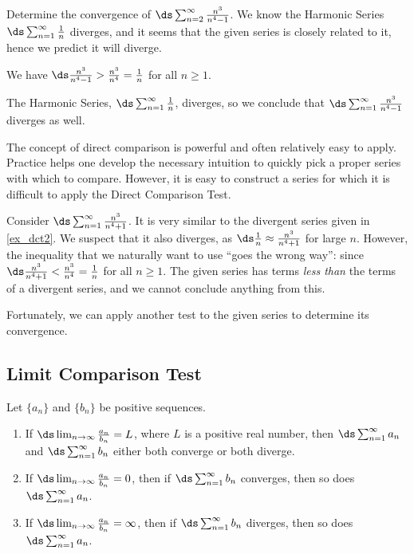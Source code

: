 \begin{example}\label{ex_dct2}
Determine the convergence of $\ds\sum_{n=2}^\infty \frac{n^3}{n^4-1}$.
\solution
We know the Harmonic Series $\ds\sum_{n=1}^\infty \frac1n$ diverges, and it seems that the given series is closely related to it, hence we predict it will diverge. 

We have $\ds \frac{n^3}{n^4-1}>\frac{n^3}{n^4}=\frac{1}{n}$ for all $n\geq 1$. 

The Harmonic Series, $\ds\sum_{n=1}^\infty \frac{1}{n}$,  diverges, so we conclude that $\ds\sum_{n=1}^\infty \frac{n^3}{n^4-1}$ diverges as well.
\end{example}

The concept of direct comparison is powerful and often relatively easy to apply. Practice helps one develop the necessary intuition to quickly pick a proper series with which to compare. However, it is easy to construct a series for which it is difficult to apply the Direct Comparison Test. 

Consider $\ds\sum_{n=1}^\infty \frac{n^3}{n^4+1}$. It is very similar to the divergent series given in \autoref{ex_dct2}. We suspect that it also diverges, as $\ds \frac 1n \approx \frac{n^3}{n^4+1}$ for large $n$. However, the inequality that we naturally want to use ``goes the wrong way'': since  $\ds \frac{n^3}{n^4+1}<\frac{n^3}{n^4}=\frac{1}{n}$ for all $n\geq 1$. The given series has terms \emph{less than} the terms of a divergent series, and we cannot conclude anything from this.

Fortunately, we can apply another test to the given series to determine its convergence.

\clearpage

\subsection{Limit Comparison Test}

\begin{theorem}\label{thm:series_limit_compare}
Let $\{a_n\}$ and $\{b_n\}$ be positive sequences.
\begin{enumerate}
	\item If $\ds\lim_{n\to\infty} \frac{a_n}{b_n} = L$, where $L$ is a positive real number, then $\ds \sum_{n=1}^\infty a_n$ and $\ds \sum_{n=1}^\infty b_n$ either both converge or both diverge.
	\item	If $\ds\lim_{n\to\infty} \frac{a_n}{b_n} = 0$, then if $\ds \sum_{n=1}^\infty b_n$ converges, then so does $\ds \sum_{n=1}^\infty a_n$.
	\item	If $\ds\lim_{n\to\infty} \frac{a_n}{b_n} = \infty$, then if $\ds \sum_{n=1}^\infty b_n$ diverges, then so does $\ds \sum_{n=1}^\infty a_n$.
\end{enumerate}
\end{theorem}

